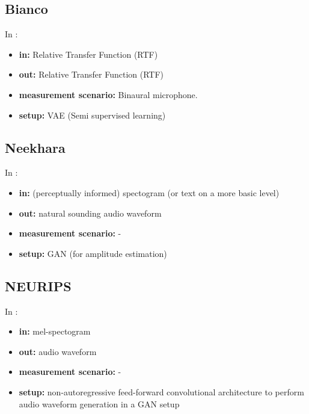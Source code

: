 \documentclass{article}
\begin{document}
\subsection{Bianco}

In \cite{bianco2020semi}:

\begin{itemize} 
    \item \textbf{in:} Relative Transfer Function (RTF)
    \item \textbf{out:} Relative Transfer Function (RTF)
    \item \textbf{measurement scenario:} Binaural microphone.
    \item \textbf{setup:} VAE (Semi supervised learning)
\end{itemize}

\subsection{Neekhara}

In \cite{neekhara2019expediting}:

\begin{itemize}
    \item \textbf{in:} (perceptually informed) spectogram (or text on a more basic level)
    \item \textbf{out:} natural sounding audio waveform
    \item \textbf{measurement scenario:} -
    \item \textbf{setup:} GAN (for amplitude estimation)
\end{itemize}

\subsection{NEURIPS}

In \cite{NEURIPS2019_6804c9bc}:

\begin{itemize}
    \item \textbf{in:} mel-spectogram 
    \item \textbf{out:} audio waveform
    \item \textbf{measurement scenario:} -
    \item \textbf{setup:} non-autoregressive feed-forward convolutional architecture to
    perform audio waveform generation in a GAN setup
\end{itemize}
\end{document}
